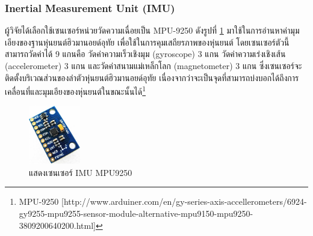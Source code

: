 \clearpage
\subsubsection*{Inertial Measurement Unit (IMU)}
ผู้วิจัยได้เลือกใช้เซนเซอร์หน่วยวัดความเฉื่อยเป็น MPU-9250 ดังรูปที่ \ref{fig:mpu9250} มาใช้ในการอ่านหาค่ามุมเอียงของฐานหุ่นยนต์ฮิวมานอยด์อุทัย
เพื่อใช้ในการคุมเสถียรภาพของหุ่นยนต์
โดยเซนเซอร์ตัวนี้สามารถวัดค่าได้ 9 แกนคือ วัดค่าความเร็วเชิงมุม (gyroscope) 3 แกน วัดค่าความเร่งเชิงเส้น (accelerometer) 3 แกน
และวัดค่าสนามแม่เหล็กโลก (magnetometer) 3 แกน ซึ่งเซนเซอร์จะติดตั้งบริเวณส่วนของลำตัวหุ่นยนต์ฮิวมานอยด์อุทัย
เนื่องจากว่าจะเป็นจุดที่สามารถบ่งบอกได้ถึงการเคลื่อนที่และมุมเอียงของหุ่นยนต์ในขณะนั้นได้\footnote{ MPU-9250 [http://www.arduiner.com/en/gy-series-axis-accellerometers/6924-gy9255-mpu9255-sensor-module-alternative-mpu9150-mpu9250-3809200640200.html] }
\begin{figure}[!ht]
    \centering
    \includegraphics[width=0.2\textwidth]{chapter3/images/mpu9250.jpeg}
    \caption{แสดงเซนเซอร์ IMU MPU9250}
    \label{fig:mpu9250}
\end{figure}

